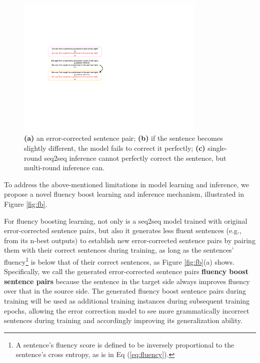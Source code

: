 \documentclass{article} %
\begin{document}
\begin{figure}[h]
\centering
\includegraphics[width=9cm]{figures/gec_limitation.pdf}\vspace{-0.2cm}
\caption{\textbf{(a)} an error-corrected sentence pair; \textbf{(b)} if the sentence becomes slightly different, the model fails to correct it perfectly; \textbf{(c)} single-round seq2seq inference cannot perfectly correct the sentence, but multi-round inference can.}\label{fig:limitations}\vspace{-0.1cm}
\end{figure}



To address the above-mentioned limitations in model learning and inference, we propose a novel fluency boost learning and inference mechanism, illustrated in Figure \ref{fig:fb}.

For fluency boosting learning, not only is a seq2seq model trained with original error-corrected sentence pairs, but also it generates less fluent sentences (e.g., from its n-best outputs) to establish new error-corrected sentence pairs by pairing them with their correct sentences during training, as long as the sentences' fluency\footnote{A sentence's fluency score is defined to be inversely proportional to the sentence's cross entropy, as is in Eq (\ref{eq:fluency}).} is below that of their correct sentences, as Figure \ref{fig:fb}(a) shows. Specifically, we call the generated error-corrected sentence pairs \textbf{fluency boost sentence pairs} because the sentence in the target side always improves fluency over that in the source side. The generated fluency boost sentence pairs during training will be used as additional training instances during subsequent training epochs, allowing the error correction model to see more grammatically incorrect sentences during training and accordingly improving its generalization ability. %
\end{document}
